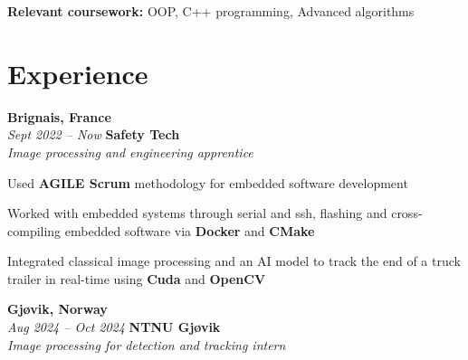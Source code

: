         \begin{onecolentry}
            \begin{highlights}
                \item \textbf{Relevant coursework:} OOP, C++ programming, Advanced algorithms
            \end{highlights}
        \end{onecolentry}


    \section{Experience}
        \begin{twocolentry}{
			\textbf{Brignais, France} \\
			\textit{Sept 2022 – Now}
            }{
            \textbf{Safety Tech} \\
            \textit{Image processing and engineering apprentice}
            }
        \end{twocolentry}

        \begin{onecolentry}
            \begin{highlights}
                \item Used \textbf{AGILE Scrum} methodology for embedded software development
				\item Worked with embedded systems through serial and ssh, flashing and cross-compiling embedded software via \textbf{Docker} and \textbf{CMake}
				\item Integrated classical image processing and an AI model to track the end of a truck trailer in real-time using \textbf{Cuda} and \textbf{OpenCV}
            \end{highlights}
        \end{onecolentry}

        \begin{twocolentry}{
			\textbf{Gjøvik, Norway} \\
			\textit{Aug 2024 – Oct 2024}
            }{
			\textbf{NTNU Gjøvik} \\
			\textit{Image processing for detection and tracking intern}
            }
        \end{twocolentry}

